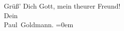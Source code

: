 \begin{ledgroupsized}[t]{13cm}
           \pstart
           Grüß’ Dich Gott, mein theurer Freund! {\\[\baselineskip]}Dein {\\[\baselineskip]}\spacefill\mbox{Paul Goldmann.}\pend
           \leftskip=0em{}          \endnumbering{}\end{ledgroupsized}\begin{anhang}\end{anhang}\newcommand{\dateiname}{L02709}\newcommand{\titel}{Paul Goldmann an Arthur Schnitzler, 3. 6. 1893}\newcommand{\editorInnen}{Martin Anton Müller und Laura Untner}
            \footnotesize
\begin{ledgroupsized}[t]{11.5cm}
\end{ledgroupsized}
         
      